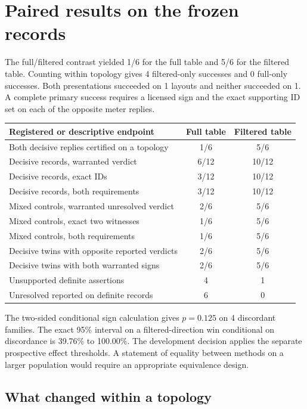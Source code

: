 \documentclass[12pt,letterpaper]{article}
\begin{document}
\section{Paired results on the frozen records}

The full/filtered contrast yielded 1/6 for the full table and 5/6 for the filtered table. Counting within topology gives 4 filtered-only successes and 0 full-only successes. Both presentations succeeded on 1 layouts and neither succeeded on 1. A complete primary success requires a licensed sign and the exact supporting ID set on each of the opposite meter replies.

\begin{center}{\small\setlength{\tabcolsep}{4pt}\begin{tabularx}{\linewidth}{@{}Ycc@{}}\toprule
Registered or descriptive endpoint & Full table & Filtered table\\ \midrule
Both decisive replies certified on a topology & 1/6 & 5/6\\
Decisive records, warranted verdict & 6/12 & 10/12\\
Decisive records, exact IDs & 3/12 & 10/12\\
Decisive records, both requirements & 3/12 & 10/12\\
Mixed controls, warranted unresolved verdict & 2/6 & 5/6\\
Mixed controls, exact two witnesses & 1/6 & 5/6\\
Mixed controls, both requirements & 1/6 & 5/6\\
Decisive twins with opposite reported verdicts & 2/6 & 5/6\\
Decisive twins with both warranted signs & 2/6 & 5/6\\
Unsupported definite assertions & 4 & 1\\
Unresolved reported on definite records & 6 & 0\\ \bottomrule\end{tabularx}}
\end{center}

The two-sided conditional sign calculation gives $p=0.125$ on 4 discordant families. The exact 95\% interval on a filtered-direction win conditional on discordance is 39.76\% to 100.00\%. The development decision applies the separate prospective effect thresholds. A statement of equality between methods on a larger population would require an appropriate equivalence design.

\subsection{What changed within a topology}
\end{document}
